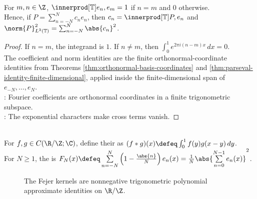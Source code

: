 \begin{proposition} \label{prop:period-one-characters-orthonormal} \\
For $m,n\in\Z$, $\innerprod[\mathbb{T}]{e_n,e_m}=1$ if $n=m$ and $0$ otherwise.\\
Hence, if $P=\sum\limits_{n=-N}^{N}c_ne_n$, then $c_n=\innerprod[\mathbb{T}]{P,e_n}$ and $\norm{P}_{L^2(\mathbb{T})}^2=\sum_{n=-N}^{N}\abs{c_n}^2$.
\begin{proof}
If $n=m$, the integrand is $1$. If $n\neq m$, then $\int_0^1e^{2\pi i(n-m)x}\,dx=0$.\\
The coefficient and norm identities are the finite orthonormal-coordinate identities from Theorems \ref{thm:orthonormal-basis-coordinates} and \ref{thm:parseval-identity-finite-dimensional}, applied inside the finite-dimensional span of $e_{-N},\ldots,e_N$.\\
: Fourier coefficients are orthonormal coordinates in a finite trigonometric subspace.\\
: The exponential characters make cross terms vanish.
\end{proof}
\end{proposition}

\begin{definition} \label{def:periodic-convolution-and-fejer-kernel} \\
For $f,g\in C(\R/\Z;\C)$, define their  as $(f*g)(x)\defeq\int_0^1 f(y)g(x-y)\,dy$.\\
For $N\geq1$, the  is $F_N(x)\defeq \sum\limits_{n=-N}^{N}\left(1-\frac{\abs{n}}{N}\right)e_n(x) =\frac{1}{N}\abs{\sum\limits_{n=0}^{N-1}e_n(x)}^2$.
\end{definition}

\begin{figure}[H]
  \centering
  
  \caption{The Fejer kernels are nonnegative trigonometric polynomial approximate identities on $\R/\Z$.}
  \label{fig:fejer-kernel-periodic-approx-identity}
\end{figure}

